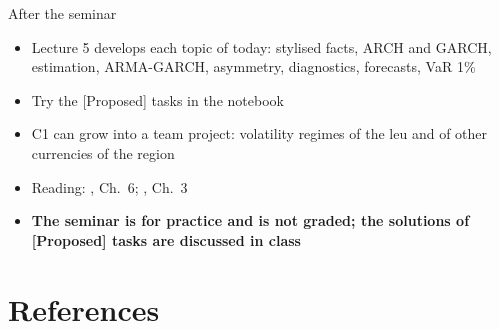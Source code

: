 \begin{frame}{After the seminar}
\itemsize{\small}
\begin{itemize}
    \item Lecture 5 develops each topic of today: stylised facts, ARCH and GARCH, estimation, ARMA-GARCH, asymmetry, diagnostics, forecasts, VaR 1\%
    \item Try the [Proposed] tasks in the notebook
    \item C1 can grow into a team project: volatility regimes of the leu and of other currencies of the region
    \item Reading: , Ch.~6; , Ch.~3
    \item \textbf{The seminar is for practice and is not graded; the solutions of [Proposed] tasks are discussed in class}
\end{itemize}
\end{frame}


\section{References}


